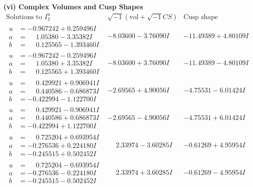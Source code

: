\documentclass[1p]{elsarticle_modified}
\theoremstyle{definition}
\newcommand{\I}{\sqrt{-1}}
\begin{document}
\newpage\flushleft \textbf{(vi) Complex Volumes and Cusp Shapes}
$$\begin{array}{c|c|c}  
\text{Solutions to }I^u_{2}& \I (\text{vol} + \sqrt{-1}CS) & \text{Cusp shape}\\
 \hline 
\begin{aligned}
u &= -0.967242 + 0.259496 I \\
a &= \phantom{-}1.05380 - 3.35382 I \\
b &= \phantom{-}0.125565 - 1.393460 I\end{aligned}
 & -8.03600 - 3.76090 I & -11.49389 + 4.80109 I \\ \hline\begin{aligned}
u &= -0.967242 - 0.259496 I \\
a &= \phantom{-}1.05380 + 3.35382 I \\
b &= \phantom{-}0.125565 + 1.393460 I\end{aligned}
 & -8.03600 + 3.76090 I & -11.49389 - 4.80109 I \\ \hline\begin{aligned}
u &= \phantom{-}0.429921 + 0.906941 I \\
a &= \phantom{-}0.440586 - 0.686873 I \\
b &= -0.422994 - 1.122700 I\end{aligned}
 & -2.69565 + 4.90056 I & -4.75531 - 6.01424 I \\ \hline\begin{aligned}
u &= \phantom{-}0.429921 - 0.906941 I \\
a &= \phantom{-}0.440586 + 0.686873 I \\
b &= -0.422994 + 1.122700 I\end{aligned}
 & -2.69565 - 4.90056 I & -4.75531 + 6.01424 I \\ \hline\begin{aligned}
u &= \phantom{-}0.725204 + 0.693954 I \\
a &= -0.276536 + 0.224180 I \\
b &= -0.245515 + 0.502452 I\end{aligned}
 & \phantom{-}2.33974 - 3.60285 I & -0.61269 + 4.95954 I \\ \hline\begin{aligned}
u &= \phantom{-}0.725204 - 0.693954 I \\
a &= -0.276536 - 0.224180 I \\
b &= -0.245515 - 0.502452 I\end{aligned}
 & \phantom{-}2.33974 + 3.60285 I & -0.61269 - 4.95954 I \\ \hline\begin{aligned}

\end{aligned}
\end{array}$$
\end{document}
